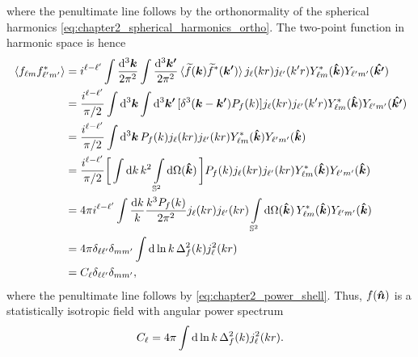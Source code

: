 %
where the penultimate line follows by the orthonormality of the spherical harmonics \cref{eq:chapter2_spherical_harmonics_ortho}.
The two-point function in harmonic space is hence
%
\begin{align}
	\expval*{\harmonic{f}\conj{\harmonic[']{f}}}
	 & = i^{\ell-\ell'} \int\frac{\dd[3]{\vb*{k}}}{2\pi^{2}} \int\frac{\dd[3]{\vb*{k'}}}{2\pi^{2}} \expval*{\fourier{f}(\vb*{k}) \conj{\fourier{f}}(\vb*{k'})} \bessel{k r} \bessel[']{k'r} \conj{\harmonic{Y}}(\vu*{k}) \harmonic[']{Y}(\vu*{k'}) \nonumber{} \\
	 & = \frac{i^{\ell-\ell'}}{\pi/2} \int\dd[3]{\vb*{k}} \int\dd[3]{\vb*{k'}} [\delta^{3}(\vb*{k} - \vb*{k'}) \powerSpectrumDim{f}] \bessel{k r} \bessel[']{k'r} \conj{\harmonic{Y}}(\vu*{k}) \harmonic[']{Y}(\vu*{k'}) \nonumber{}                           \\
	 & = \frac{i^{\ell-\ell'}}{\pi/2} \int\dd[3]{\vb*{k}} \powerSpectrumDim{f} \bessel{k r} \bessel[']{k r} \conj{\harmonic{Y}}(\vu*{k}) \harmonic[']{Y}(\vu*{k}) \nonumber{}                                                                                  \\
	 & = \frac{i^{\ell-\ell'}}{\pi/2} \bigg[\int\dd{k} k^{2} \integrateSphere{\vu*{k}}\bigg] \powerSpectrumDim{f} \bessel{k r} \bessel[']{k r} \conj{\harmonic{Y}}(\vu*{k}) \harmonic[']{Y}(\vu*{k}) \nonumber{}                                               \\
	 & = 4\pi i^{\ell-\ell'} \int\frac{\dd{k}}{k} \frac{k^{3}\powerSpectrumDim{f}}{2\pi^{2}} \bessel{k r} \bessel[']{k r} \integrateSphere{\vu*{k}} \conj{\harmonic{Y}}(\vu*{k}) \harmonic[']{Y}(\vu*{k}) \nonumber{}                                          \\
	 & = 4\pi \delta_{\ell\ell'} \delta_{m m'} \int\dd{\ln{k}} \Delta_{f}^{2}(k) j^{2}_{\ell}(k r) \nonumber{}                                                                                                                                                 \\
	 & = \powerSpectrum \delta_{\ell\ell'} \delta_{m m'},
\end{align}
%
where the penultimate line follows by \cref{eq:chapter2_power_shell}.
Thus, \(f(\vu*{n})\) is a statistically isotropic field with angular power spectrum
%
\begin{equation}
	\powerSpectrum
	= 4\pi \int\dd{\ln{k}} \Delta_{f}^{2}(k) j^{2}_{\ell}(k r).
\end{equation}



